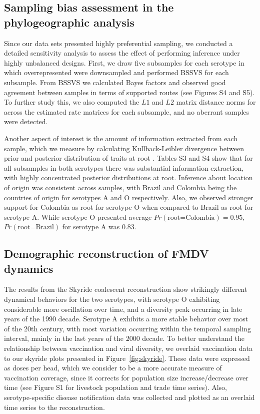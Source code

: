 \documentclass[10pt]{article}
\begin{document}
\subsection*{Sampling bias assessment in the phylogeographic analysis}
Since our data sets presented highly preferential sampling, we conducted a detailed sensitivity analysis to assess the effect of performing inference under highly unbalanced designs.
First, we draw five subsamples for each serotype in which overrepresented were downsampled and performed BSSVS for each subsample.
From BSSVS we calculated Bayes factors and observed good agreement between samples in terms of supported routes (see Figures S4 and S5). %
To further study this, we also computed the $L1$ and $L2$ matrix distance norms for across the estimated rate matrices for each subsample, and no aberrant samples were detected.

Another aspect of interest is the amount of information extracted from each sample, which we measure by calculating Kullback-Leibler divergence between prior and posterior distribution of traits at root \cite{roots}.
Tables S3 and S4 show that for all subsamples in both serotypes there was substantial information extraction, with highly concentrated posterior distributions at root.
Inference about location of origin was consistent across samples, with Brazil and Colombia being the countries of origin for serotypes A and O respectively.
Also, we observed stronger support for Colombia as root for serotype O when compared to Brazil as root for serotype A.
While serotype O presented average $Pr(\text{root=Colombia})=0.95$, $Pr(\text{root=Brazil})$ for serotype A was $0.83$.
\subsection*{Demographic reconstruction of FMDV dynamics}

The results from the Skyride coalescent reconstruction show strikingly different dynamical behaviors for the two serotypes, with serotype O exhibiting considerable more oscillation over time, and a diversity peak occurring in late years of the 1990 decade.
Serotype A exhibits a more stable behavior over most of the 20th century, with most variation occurring within the temporal sampling interval, mainly in the last years of the 2000 decade.
To better understand the relationship between vaccination and viral diversity, we overlaid vaccination data to our skyride plots presented in Figure~\ref{fig:skyride}.
These data were expressed as doses per head, which we consider to be a more accurate measure of vaccination coverage, since it corrects for population size increase/decrease over time (see Figure S1 for livestock population and trade time series). %
Also, serotype-specific disease notification data was collected and plotted as an overlaid time series to the reconstruction. 
\end{document}
